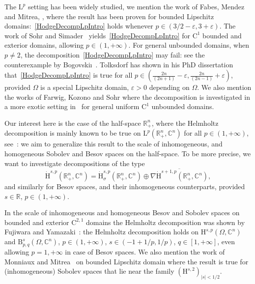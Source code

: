 \documentclass[10pt]{amsart}
\theoremstyle{definition}\newtheorem{defi}[theo]{Definition}\newtheorem{rema}[theo]{Remark}\newtheorem{exam}[theo]{Example}\newtheorem{exem}[theo]{Example}\newtheorem{nota}[theo]{Notation}
\newcommand{\bbR}{\mathbb{R}}
\newcommand{\bbC}{\mathbb{C}}
\newcommand{\rmH}{\mathrm{H}}%
\newcommand{\rmB}{\mathrm{B}}
\newcommand{\rmL}{\mathrm{L}}
\newcommand{\rmC}{\mathrm{C}}
\begin{document}
The $\rmL^p$ setting has been widely studied, we mention the work of Fabes, Mendez and Mitrea, \cite[Theorem~12.2]{FabesMendezMitrea1998}, where the result has been proven for bounded Lipschitz domains:~\eqref{HodgeDecompLpIntro} holds whenever $p\in (3/2-\varepsilon,3+\varepsilon)$. The work of Sohr and Simader~\cite[Theorem~1.4]{SimaderSohr1992} yields~\eqref{HodgeDecompLpIntro} for $\rmC^1$ bounded and exterior domains, allowing $p\in(1,+\infty)$. For general unbounded domains, when $p\neq 2$, the decomposition~\eqref{HodgeDecompLpIntro} may fail: see the counterexample by Bogovski\i~\cite[Section~2]{Bogovskii1986}. Tolksdorf has shown in his PhD dissertation~\cite[Theorem~5.1.10]{TolksdorfPhDThesis2017} that~\eqref{HodgeDecompLpIntro} is true for all $p\in(\tfrac{2n}{(2n+1)}-\varepsilon,\tfrac{2n}{(2n-1)}+\varepsilon)$, provided $\Omega$ is a special Lipschitz domain, $\varepsilon>0$ depending on $\Omega$. We also mention the works of Farwig, Kozono and Sohr where the decomposition is investigated in a more exotic setting in~\cite{FarwigKozonoSohr2005,FarwigKozonoSohr2007} for general uniform $\rmC^1$ unbounded domains.


Our interest here is the case of the half-space $\bbR^n_+$, where the Helmholtz decomposition is mainly known to be true on $\rmL^p(\bbR^n_+,\bbC^n)$ for all $p\in(1,+\infty)$, see~\cite[Remark~III.1.2]{bookGaldi2011}: we aim to generalize this result to the scale of inhomogeneous, and homogeneous Sobolev and Besov spaces on the half-space. To be more precise, we want to investigate decompositions of the type
\begin{equation}\label{eq:HelmholtzDecompHspIntro}
\dot{\rmH}^{s,p}\left(\bbR^n_+,\bbC^n\right) = \dot{\rmH}^{s,p}_{\sigma}\left(\bbR^n_+,\bbC^n\right) \oplus \overline{\nabla \dot{\rmH}^{s+1,p}\left(\bbR^n_+,\bbC^n\right)},
\end{equation}
and similarly for Besov spaces, and their inhomogeneous counterparts, provided $s\in\bbR$, $p\in(1,+\infty)$.

In the scale of inhomogeneous and homogeneous Besov and Sobolev spaces on bounded and exterior $\rmC^{2,1}$ domains the Helmholtz decomposition was shown by Fujiwara and Yamazaki~\cite[Theorem~3.1]{FujiwaraYamazaki2007}: the Helmholtz decomposition holds on $\rmH^{s,p}(\Omega,\bbC^n)$ and $\rmB^{s}_{p,q}(\Omega,\bbC^n)$, $p\in (1,+\infty)$, $s\in(-1+1/p,1/p)$, $q\in[1,+\infty]$, even allowing $p=1,+\infty$ in case of Besov spaces. We also mention the work of Monniaux and Mitrea~\cite[Proposition~2.16]{MitreaMonniaux2008} on bounded Lipschitz domain where the result is true for (inhomogeneous) Sobolev spaces that lie near the family $(\rmH^{s,2})_{|s|<1/2}$.
\end{document}
